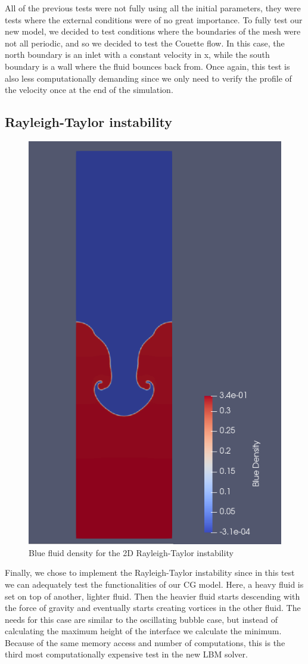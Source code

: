 \documentclass[12pt]{book}
\begin{document}
All of the previous tests were not fully using all the initial parameters, they were tests where the external conditions were of no great importance. To fully test our new model, we decided to test conditions where the boundaries of the mesh were not all periodic, and so we decided to test the Couette flow. In this case, the north boundary is an inlet with a constant velocity in x, while the south boundary is a wall where the fluid bounces back from. Once again, this test is also less computationally demanding since we only need to verify the profile of the velocity once at the end of the simulation. 

\subsection{Rayleigh-Taylor instability}
\begin{figure}[H]
	\centering
	\includegraphics[width=0.5\linewidth]{Resources/Images/rt.png}
	\caption{Blue fluid density for the 2D Rayleigh-Taylor instability}
	\label{fig:rt}
\end{figure}
Finally, we chose to implement the Rayleigh-Taylor instability since in this test we can adequately test the functionalities of our CG model. Here, a heavy fluid is set on top of another, lighter fluid. Then the heavier fluid starts descending with the force of gravity and eventually starts creating vortices in the other fluid. The needs for this case are similar to the oscillating bubble case, but instead of calculating the maximum height of the interface we calculate the minimum. Because of the same memory access and number of computations, this is the third most computationally expensive test in the new LBM solver.
\end{document}
